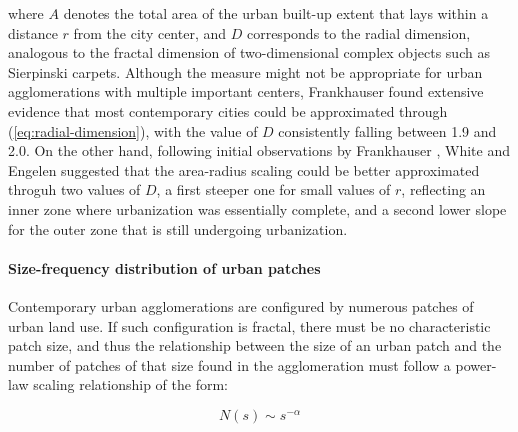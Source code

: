 \documentclass[10pt,letterpaper]{article}
\begin{document}
where $A$ denotes the total area of the urban built-up extent that lays within a distance $r$ from the city center, and $D$ corresponds to the radial dimension, analogous to the fractal dimension of two-dimensional complex objects such as Sierpinski carpets.
Although the measure might not be appropriate for urban agglomerations with multiple important centers, Frankhauser \cite{frankhauser1994fractalite} found extensive evidence that most contemporary cities could be approximated through (\ref{eq:radial-dimension}), with the value of $D$ consistently falling between 1.9 and 2.0.
On the other hand, following initial observations by Frankhauser \cite{frankhauser1990aspects}, White and Engelen \cite{white1993cellular} suggested that the area-radius scaling could be better approximated throguh two values of $D$, a first steeper one for small values of $r$, reflecting an inner zone where urbanization was essentially complete, and a second lower slope for the outer zone that is still undergoing urbanization.


\paragraph*{Size-frequency distribution of urban patches}
Contemporary urban agglomerations are configured by numerous patches of urban land use.
If such configuration is fractal, there must be no characteristic patch size, and thus the relationship between the size of an urban patch and the number of patches of that size found in the agglomeration must follow a power-law scaling relationship of the form:

\begin{equation}
  \label{eq:size-frequency}
  N(s) \sim s^{-\alpha}
\end{equation}
\end{document}
